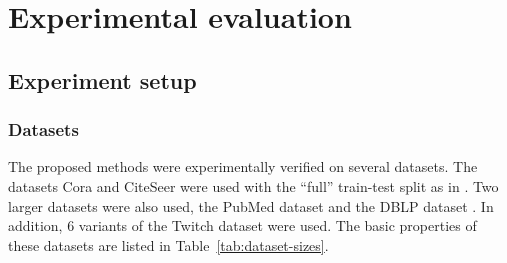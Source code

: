 \section{Experimental evaluation}\label{sec:experimental-evaluation}

\subsection{Experiment setup}

\subsubsection{Datasets}

The proposed methods were experimentally verified on several datasets. The datasets Cora and CiteSeer \cite{yang_revisiting_2016} were used with the \enquote{full} train-test split as in \cite{chen_fastgcn_2018}. Two larger datasets were also used, the PubMed dataset \cite{yang_revisiting_2016} and the DBLP dataset \cite{bojchevski_deep_2018}. In addition, 6 variants of the Twitch dataset \cite{rozemberczki_multi-scale_2021} were used. The basic properties of these datasets are listed in Table~\ref{tab:dataset-sizes}.

